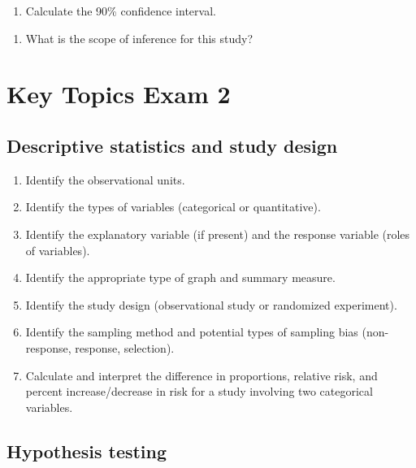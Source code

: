 \documentclass[
]{report}
\providecommand{\tightlist}{%
  \setlength{\itemsep}{0pt}\setlength{\parskip}{0pt}}
\begin{document}
\begin{enumerate}
\def\labelenumi{\arabic{enumi}.}
\setcounter{enumi}{18}
\tightlist
\item
  Calculate the 90\% confidence interval.
\end{enumerate}

\vspace{1in}

\begin{enumerate}
\def\labelenumi{\arabic{enumi}.}
\setcounter{enumi}{19}
\tightlist
\item
  What is the scope of inference for this study?
\end{enumerate}

\newpage

\section{Key Topics Exam 2}\label{key-topics-exam-2}

\subsection*{Descriptive statistics and study design}\label{descriptive-statistics-and-study-design-1}

\begin{enumerate}
\def\labelenumi{\arabic{enumi}.}
\item
  Identify the observational units.
\item
  Identify the types of variables (categorical or quantitative).
\item
  Identify the explanatory variable (if present) and the response variable (roles of variables).
\item
  Identify the appropriate type of graph and summary measure.
\item
  Identify the study design (observational study or randomized experiment).
\item
  Identify the sampling method and potential types of sampling bias (non-response, response, selection).
\item
  Calculate and interpret the difference in proportions, relative risk, and percent increase/decrease in risk for a study involving two categorical variables.
\end{enumerate}

\subsection*{Hypothesis testing}\label{hypothesis-testing-5}
\end{document}
